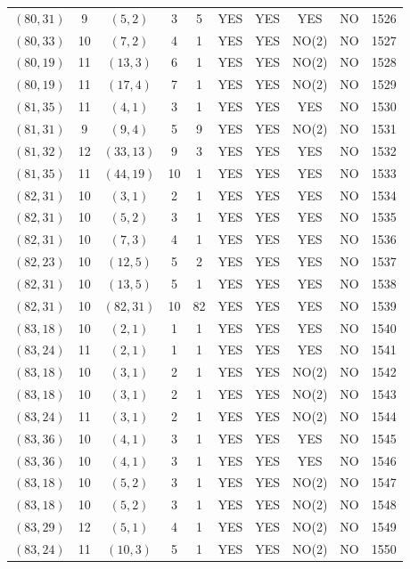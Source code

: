 \begin{longtable}{|c|c|c|c|c|c|c|c|c|c|}
$(80, 31)$ & 9 & $(5, 2)$ & 3 & 5 & YES & YES & YES & NO & 1526\\
$(80, 33)$ & 10 & $(7, 2)$ & 4 & 1 & YES & YES & NO(2) & NO & 1527\\
$(80, 19)$ & 11 & $(13, 3)$ & 6 & 1 & YES & YES & NO(2) & NO & 1528\\
$(80, 19)$ & 11 & $(17, 4)$ & 7 & 1 & YES & YES & NO(2) & NO & 1529\\
$(81, 35)$ & 11 & $(4, 1)$ & 3 & 1 & YES & YES & YES & NO & 1530\\
$(81, 31)$ & 9 & $(9, 4)$ & 5 & 9 & YES & YES & NO(2) & NO & 1531\\
$(81, 32)$ & 12 & $(33, 13)$ & 9 & 3 & YES & YES & YES & NO & 1532\\
$(81, 35)$ & 11 & $(44, 19)$ & 10 & 1 & YES & YES & YES & NO & 1533\\
$(82, 31)$ & 10 & $(3, 1)$ & 2 & 1 & YES & YES & YES & NO & 1534\\
$(82, 31)$ & 10 & $(5, 2)$ & 3 & 1 & YES & YES & YES & NO & 1535\\
$(82, 31)$ & 10 & $(7, 3)$ & 4 & 1 & YES & YES & YES & NO & 1536\\
$(82, 23)$ & 10 & $(12, 5)$ & 5 & 2 & YES & YES & YES & NO & 1537\\
$(82, 31)$ & 10 & $(13, 5)$ & 5 & 1 & YES & YES & YES & NO & 1538\\
$(82, 31)$ & 10 & $(82, 31)$ & 10 & 82 & YES & YES & YES & NO & 1539\\
$(83, 18)$ & 10 & $(2, 1)$ & 1 & 1 & YES & YES & YES & NO & 1540\\
$(83, 24)$ & 11 & $(2, 1)$ & 1 & 1 & YES & YES & YES & NO & 1541\\
$(83, 18)$ & 10 & $(3, 1)$ & 2 & 1 & YES & YES & NO(2) & NO & 1542\\
$(83, 18)$ & 10 & $(3, 1)$ & 2 & 1 & YES & YES & NO(2) & NO & 1543\\
$(83, 24)$ & 11 & $(3, 1)$ & 2 & 1 & YES & YES & NO(2) & NO & 1544\\
$(83, 36)$ & 10 & $(4, 1)$ & 3 & 1 & YES & YES & YES & NO & 1545\\
$(83, 36)$ & 10 & $(4, 1)$ & 3 & 1 & YES & YES & YES & NO & 1546\\
$(83, 18)$ & 10 & $(5, 2)$ & 3 & 1 & YES & YES & NO(2) & NO & 1547\\
$(83, 18)$ & 10 & $(5, 2)$ & 3 & 1 & YES & YES & NO(2) & NO & 1548\\
$(83, 29)$ & 12 & $(5, 1)$ & 4 & 1 & YES & YES & NO(2) & NO & 1549\\
$(83, 24)$ & 11 & $(10, 3)$ & 5 & 1 & YES & YES & NO(2) & NO & 1550\\

\end{longtable}
